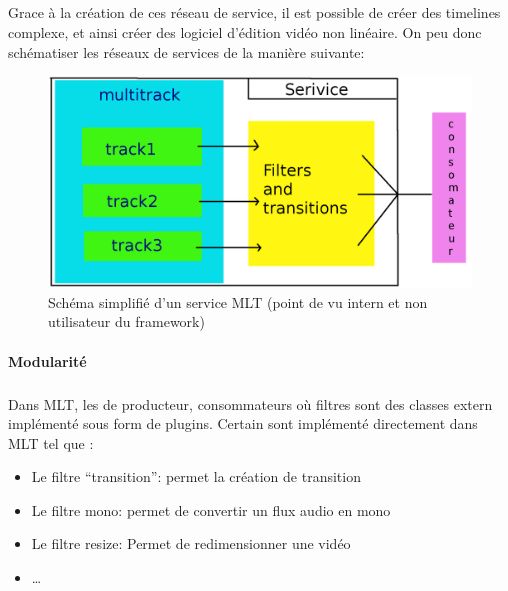 \subparagraph{}

Grace à la création de ces réseau de service, il est possible de
créer des timelines complexe, et ainsi créer des logiciel d'édition
vidéo non linéaire. On peu donc schématiser les réseaux de services
de la manière suivante:

\begin{figure} [H]

  \begin{center}

    \includegraphics[width=1.0\textwidth]{images/service}

  \end{center}

  \caption{Schéma simplifié d'un service MLT (point de vu intern et
    non utilisateur du framework)}

  \label{Yes}

\end{figure}

\paragraph{Modularité}

\subparagraph{}

Dans MLT, les de producteur, consommateurs où filtres sont des classes
extern implémenté sous form de plugins. Certain sont implémenté
directement dans MLT tel que :

\begin{itemize}

  \item {Le filtre ``transition'': permet la création de transition}

  \item {Le filtre mono: permet de convertir un flux audio en mono}

  \item {Le filtre resize: Permet de redimensionner une vidéo}

  \item {\ldots}

\end{itemize}

